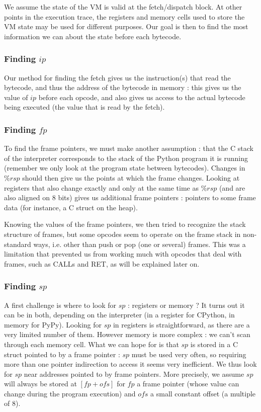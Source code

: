 \documentclass[english]{article}
\begin{document}
We assume the state of the VM is valid at the fetch/dispatch block. At other points in the execution trace, the registers and memory cells used to store the VM state may be used for different purposes. Our goal is then to find the most information we can about the state before each bytecode.

\subsubsection{Finding $ip$}

Our method for finding the fetch gives us the instruction(s) that read the bytecode, and thus the address of the bytecode in memory : this gives us the value of $ip$ before each opcode, and also gives us access to the actual bytecode being executed (the value that is read by the fetch).

\subsubsection{Finding $fp$}

To find the frame pointers, we must make another assumption : that the C stack of the interpreter corresponds to the stack of the Python program it is running (remember we only look at the program state between bytecodes). Changes in $\%rsp$ should then give us the points at which the frame changes. Looking at registers that also change exactly and only at the same time as $\%rsp$ (and are also aligned on 8 bits) gives us additional frame pointers : pointers to some frame data (for instance, a C struct on the heap).

Knowing the values of the frame pointers, we then tried to recognize the stack structure of frames, but some opcodes seem to operate on the frame stack in non-standard ways, i.e. other than push or pop (one or several) frames. This was a limitation that prevented us from working much with opcodes that deal with frames, such as CALLs and RET, as will be explained later on.

\subsubsection{Finding $sp$}

A first challenge is where to look for $sp$ : registers or memory ? It turns out it can be in both, depending on the interpreter (in a register for CPython, in memory for PyPy). Looking for $sp$ in registers is straightforward, as there are a very limited number of them. However memory is more complex : we can't scan through each memory cell. What we can hope for is that $sp$ is stored in a C struct pointed to by a frame pointer : $sp$ must be used very often, so requiring more than one pointer indirection to access it seems very inefficient. We thus look for $sp$ near addresses pointed to by frame pointers.  More precisely, we assume $sp$ will always be stored at $[fp + ofs]$ for $fp$ a frame pointer (whose value can change during the program execution) and $ofs$ a small constant offset (a multiple of 8).
\end{document}
